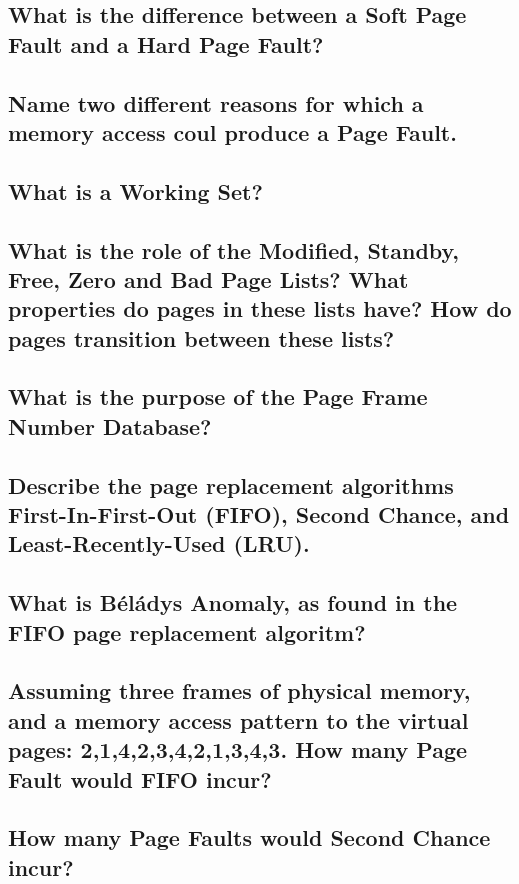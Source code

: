 \subsection{What is the difference between a Soft Page Fault and a Hard Page Fault?}

\subsection{Name two different reasons for which a memory access coul produce a Page Fault.}

\subsection{What is a Working Set?}

\subsection{What is the role of the Modified, Standby, Free, Zero and Bad Page Lists? What properties do pages in these lists have? How do pages transition between these lists?}

\subsection{What is the purpose of the Page Frame Number Database?}

\subsection{Describe the page replacement algorithms First-In-First-Out (FIFO), Second Chance, and Least-Recently-Used (LRU).}

\subsection{What is Béládys Anomaly, as found in the FIFO page replacement algoritm?}

\subsection{Assuming three frames of physical memory, and a memory access pattern to the virtual pages: 2,1,4,2,3,4,2,1,3,4,3. How many Page Fault would FIFO incur?}

\subsection{How many Page Faults would Second Chance incur?}

